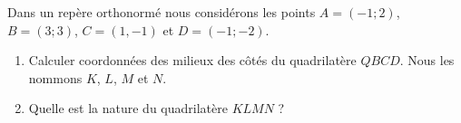 
\begin{exercice}\label{exosmath-0488}

    Dans un repère orthonormé nous considérons les points \( A=(-1;2)\), \( B=(3;3)\), \( C=(1,-1)\) et \( D=(-1;-2)\).
    \begin{enumerate}
        \item
            Calculer coordonnées des milieux des côtés du quadrilatère \( QBCD\). Nous les nommons \( K\), \( L\), \( M\) et \( N\).
        \item
            Quelle est la nature du quadrilatère \( KLMN\) ?
    \end{enumerate}
    

\end{exercice}
